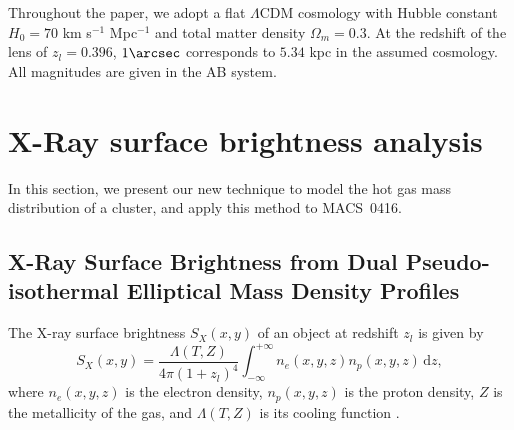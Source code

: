 \documentclass[twocolumn]{aastex61}
\begin{document}
Throughout the paper, we adopt a flat $\Lambda$CDM cosmology with Hubble
constant $H_0 = 70$ km s$^{-1}$ Mpc$^{-1}$ and total matter density
$\Omega_m = 0.3$.
At the redshift of the lens of $z_{l} = 0.396$, $1 \arcsec$ corresponds to
$5.34$ kpc in the assumed cosmology.
All magnitudes are given in the AB system.


\section{X-Ray surface brightness analysis}
\label{sec:xray_analysis}
In this section, we present our new technique to model the hot gas mass
distribution of a cluster, and apply this method to MACS~0416.

\subsection{X-Ray Surface Brightness from Dual Pseudo-isothermal Elliptical Mass Density Profiles}
The X-ray surface brightness $S_X(x,y)$ of an object at redshift $z_l$ is given by
\begin{equation}
S_X(x,y) = \frac{\Lambda(T,Z)}{4 \pi (1+z_l)^4} \int_{-\infty}^{+\infty}\!\!\! n_e(x,y,z) n_p(x,y,z)\, \text{d}z,
\label{eq:surface_brightness}
\end{equation} 
where $n_e(x,y,z)$ is the electron density, $n_p(x,y,z)$ is the proton density,
$Z$ is the metallicity of the gas, and $\Lambda(T,Z)$ is its cooling function
\citep{Boehringer1989,Sutherland1993}.
\end{document}
